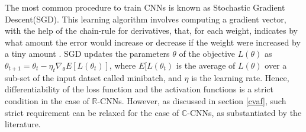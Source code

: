  The most common procedure to train CNNs is known as Stochastic Gradient Descent(SGD). This learning algorithm involves computing a gradient vector,  with the help of the chain-rule for derivatives, that, for each weight, indicates by what amount the error would increase or decrease if the weight were increased by a tiny amount \cite{nature}. SGD updates the parameters $\theta$ of the objective $L(\theta)$ as $\theta_{t+1} = \theta_{t} - \eta_{t}\nabla_{\theta}E[L(\theta_{t})]$,
 where $E[L(\theta_{t})$ is the average of $L(\theta)$ over a sub-set of the input datset called minibatch, and $\eta$ is the learning rate. Hence, differentiability of the loss function and the activation functions is a strict condition in the case of $\mathbb{R}$-CNNs. However, as discussed in section \ref{cvaf}, such strict requirement can be relaxed for the case of $\mathbb{C}$-CNNs, as substantiated by the literature. 
    
 





